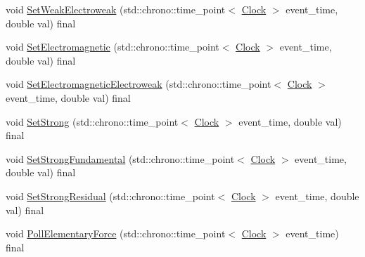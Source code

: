 \begin{DoxyCompactItemize}
void \mbox{\hyperlink{classLaw_a65e5e757041c1e72bb046eccbb6d66db}{Set\+Weak\+Electroweak}} (std\+::chrono\+::time\+\_\+point$<$ \mbox{\hyperlink{universe_8h_a0ef8d951d1ca5ab3cfaf7ab4c7a6fd80}{Clock}} $>$ event\+\_\+time, double val) final
\item 
void \mbox{\hyperlink{classLaw_acabe1a3113c207368f3bb6fe81e13963}{Set\+Electromagnetic}} (std\+::chrono\+::time\+\_\+point$<$ \mbox{\hyperlink{universe_8h_a0ef8d951d1ca5ab3cfaf7ab4c7a6fd80}{Clock}} $>$ event\+\_\+time, double val) final
\item 
void \mbox{\hyperlink{classLaw_aca9bb82839ddb46bd89f52b6211c5a54}{Set\+Electromagnetic\+Electroweak}} (std\+::chrono\+::time\+\_\+point$<$ \mbox{\hyperlink{universe_8h_a0ef8d951d1ca5ab3cfaf7ab4c7a6fd80}{Clock}} $>$ event\+\_\+time, double val) final
\item 
void \mbox{\hyperlink{classLaw_a4cd0dd1908edbd02090dd1ba1387d722}{Set\+Strong}} (std\+::chrono\+::time\+\_\+point$<$ \mbox{\hyperlink{universe_8h_a0ef8d951d1ca5ab3cfaf7ab4c7a6fd80}{Clock}} $>$ event\+\_\+time, double val) final
\item 
void \mbox{\hyperlink{classLaw_a4a7c8caa24acf453c1a8782a1ec4acf4}{Set\+Strong\+Fundamental}} (std\+::chrono\+::time\+\_\+point$<$ \mbox{\hyperlink{universe_8h_a0ef8d951d1ca5ab3cfaf7ab4c7a6fd80}{Clock}} $>$ event\+\_\+time, double val) final
\item 
void \mbox{\hyperlink{classLaw_ad4a05c77d11ddec40b1e07246cac449d}{Set\+Strong\+Residual}} (std\+::chrono\+::time\+\_\+point$<$ \mbox{\hyperlink{universe_8h_a0ef8d951d1ca5ab3cfaf7ab4c7a6fd80}{Clock}} $>$ event\+\_\+time, double val) final
\item 
void \mbox{\hyperlink{classLaw_af99520c95b2cd8af0af110b78b2288ef}{Poll\+Elementary\+Force}} (std\+::chrono\+::time\+\_\+point$<$ \mbox{\hyperlink{universe_8h_a0ef8d951d1ca5ab3cfaf7ab4c7a6fd80}{Clock}} $>$ event\+\_\+time) final
\end{DoxyCompactItemize}
